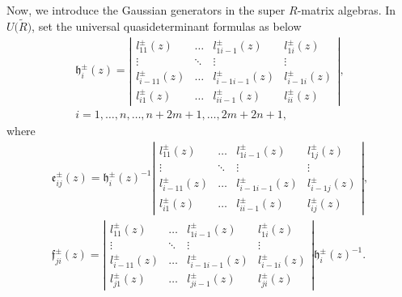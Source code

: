 \documentclass[pdftex]{sigma}
\numberwithin{equation}{section}
\begin{document}
Now, we introduce the Gaussian generators in the super $R$-matrix algebras. In $U\bigl(\widetilde{R}\bigr)$, set the universal quasideterminant formulas as below
\begin{gather*}
\mathfrak{h}_i^{\pm}(z)=\left|
 \begin{matrix}
 l_{11}^{\pm}(z) & \dots & l_{1i-1}^{\pm}(z) & l_{1i}^{\pm}(z) \\
 \vdots & \ddots & \vdots & \vdots \\
 l_{i-11}^{\pm}(z) & \dots & l_{i-1i-1}^{\pm}(z) & l_{i-1i}^{\pm}(z) \\
 l_{i1}^{\pm}(z) & \dots &l_{ii-1}^{\pm}(z) & \boxed{l_{ii}^{\pm}(z)}
 \end{matrix}\right|, \\
 i=1,\dots,n,\dots,n+2m+1,\dots,2m+2n+1,
\end{gather*}
where
\begin{gather*}\mathfrak{e}_{ij}^{\pm}(z)=\mathfrak{h}_i^{\pm}(z)^{-1}\left|
 \begin{matrix}
 l_{11}^{\pm}(z) & \dots & l_{1i-1}^{\pm}(z) & l_{1j}^{\pm}(z) \\
 \vdots & \ddots & \vdots & \vdots \\
 l_{i-11}^{\pm}(z) & \dots & l_{i-1i-1}^{\pm}(z) & l_{i-1j}^{\pm}(z) \\
 l_{i1}^{\pm}(z) & \dots &l_{ii-1}^{\pm}(z) & \boxed{l_{ij}^{\pm}(z)}
 \end{matrix}\right|,
\\
\mathfrak{f}_{ji}^{\pm}(z)=\left|
 \begin{matrix}
 l_{11}^{\pm}(z) & \dots & l_{1i-1}^{\pm}(z) & l_{1i}^{\pm}(z) \\
 \vdots & \ddots & \vdots & \vdots \\
 l_{i-11}^{\pm}(z) & \dots & l_{i-1i-1}^{\pm}(z) & l_{i-1i}^{\pm}(z) \\
 l_{j1}^{\pm}(z) & \dots &l_{ji-1}^{\pm}(z) & \boxed{l_{ji}^{\pm}(z)}
 \end{matrix}\right|\mathfrak{h}_i^{\pm}(z)^{-1}.
\end{gather*}
\end{document}
